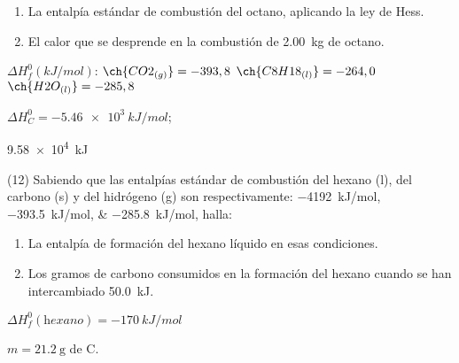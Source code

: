 \documentclass[10pt]{article}
\newenvironment{gexdatos}{
      \noindent\makebox[0pt][r]{\textit{Datos:}}
    }{\vspace{5pt}}
\begin{document}
\begin{multicols}{2}
\begin{exercise}[
    tags    = {},
    topics  = {química, termodinámica, termoquímica},
    source  = {FQ 1B MGH 2016, p180, e11},
  ]
  \begin{enumerate}
    \item La entalpía estándar de combustión del octano, aplicando la ley de Hess.
    \item El calor que se desprende en la combustión de \SI{2.00}{\kilo\gram} de octano.
  \end{enumerate}

  \begin{gexdatos}
    \( \Delta H^0_f (\si{kJ/mol}) \):
    \( \ch{CO2_{(g)}}   = -393,8 \)
    \( \ch{C8H18_{(l)}} = -264,0 \)
    \( \ch{H2O_{(l)}}   = -285,8 \)
  \end{gexdatos}
\end{exercise}

\begin{solution}
  \begin{enumerate*}
    \item \( \Delta H^0_C = \SI{-5.46e3}{kJ/mol} \); \item \SI{9.58e4}{kJ}
  \end{enumerate*}
\end{solution}




\begin{exercise}[
    tags    = {},
    topics  = {química, termodinámica, termoquímica},
    source  = {FQ 1B MGH 2016, p180, e12},
  ]
  (12) Sabiendo que las entalpías estándar de combustión del
  hexano (l), del carbono (s) y del hidrógeno (g) son respectivamente:
  \SIlist{-4192;-393,5;-285,8}{kJ/mol}, halla:

  \begin{enumerate}
    \item La entalpía de formación del hexano líquido en esas condiciones.
    \item Los gramos de carbono consumidos en la formación del hexano cuando se han intercambiado \SI{50.0}{kJ}.
  \end{enumerate}
\end{exercise}

\begin{solution}
  \begin{enumerate*}
    \item \( \Delta H^0_f (\textit{hexano}) = \SI{-170}{kJ/mol} \) \item \( m = \SI{21.2}{\gram} \) de C.
  \end{enumerate*}
\end{solution}





\end{multicols}
\end{document}
